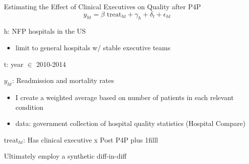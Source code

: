 \documentclass[notes,11pt, aspectratio=169]{beamer}
\newcommand{\btVFill}{\vskip0pt plus 1filll}
\newenvironment{wideitemize}{\itemize\addtolength{\itemsep}{10pt}}{\enditemize}
\begin{document}
\begin{frame}{Estimating the Effect of Clinical Executives on Quality after P4P}
\begin{equation*}
    y_{ht} = \beta \text{ treat}_{ht} + \gamma_{h} + \delta_t + \epsilon_{ht}
\end{equation*}

\vspace{3mm}

\begin{wideitemize}
    \item h: NFP hospitals in the US
    \begin{itemize}
        \item limit to general hospitals w/ stable executive teams
    \end{itemize}
    \item t: year $\in$ 2010-2014
    \item $y_{ht}$: Readmission and mortality rates
    \begin{itemize}
        \item I create a weighted average based on number of patients in each relevant condition
        \item data: government collection of hospital quality statistics (Hospital Compare)
    \end{itemize} 
    \item treat$_{ht}$: Has clinical executive x Post P4P
\end{wideitemize}
\btVFill
\begin{block}{}
    Ultimately employ a synthetic diff-in-diff
\end{block}
\end{frame}
\end{document}
